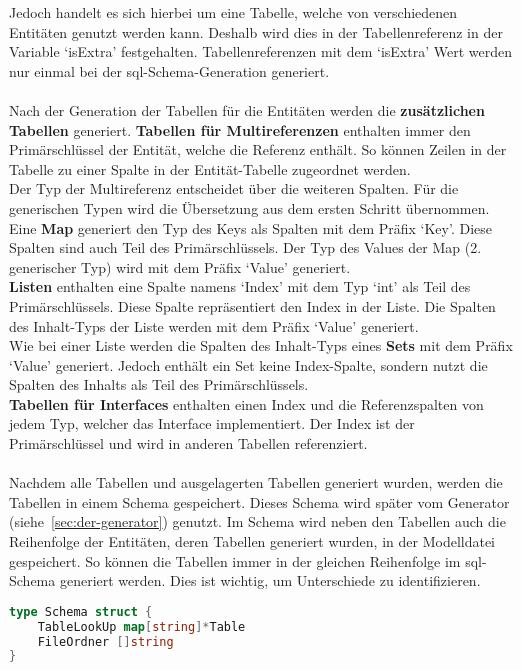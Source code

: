 \documentclass[./einleitung.tex]{subfiles}
\begin{document}
    Jedoch handelt es sich hierbei um eine Tabelle, welche von verschiedenen Entitäten genutzt werden kann.
    Deshalb wird dies in der Tabellenreferenz in der Variable `isExtra' festgehalten.
    Tabellenreferenzen mit dem `isExtra' Wert werden nur einmal bei der \acrshort{sql}-Schema-Generation generiert.
    \\\\
    Nach der Generation der Tabellen für die Entitäten werden die \textbf{zusätzlichen Tabellen} generiert.
    \textbf{Tabellen für Multireferenzen} enthalten immer den Primärschlüssel der Entität, welche die Referenz enthält.
    So können Zeilen in der Tabelle zu einer Spalte in der Entität-Tabelle zugeordnet werden.\\
    Der Typ der Multireferenz entscheidet über die weiteren Spalten.
    Für die generischen Typen wird die Übersetzung aus dem ersten Schritt übernommen.\\
    Eine \textbf{Map} generiert den Typ des Keys als Spalten mit dem Präfix `Key'.
    Diese Spalten sind auch Teil des Primärschlüssels.
    Der Typ des Values der Map (2. generischer Typ) wird mit dem Präfix `Value' generiert.\\
    \textbf{Listen} enthalten eine Spalte namens `Index' mit dem Typ `int' als Teil des Primärschlüssels.
    Diese Spalte repräsentiert den Index in der Liste.
    Die Spalten des Inhalt-Typs der Liste werden mit dem Präfix `Value' generiert.\\
    Wie bei einer Liste werden die Spalten des Inhalt-Typs eines \textbf{Sets} mit dem Präfix `Value' generiert.
    Jedoch enthält ein Set keine Index-Spalte, sondern nutzt die Spalten des Inhalts als Teil des Primärschlüssels.\\
    \textbf{Tabellen für Interfaces} enthalten einen Index und die Referenzspalten von jedem Typ, welcher das Interface implementiert.
    Der Index ist der Primärschlüssel und wird in anderen Tabellen referenziert.
    \\\\
    Nachdem alle Tabellen und ausgelagerten Tabellen generiert wurden, werden die Tabellen in einem Schema gespeichert.
    Dieses Schema wird später vom Generator (siehe~\ref{sec:der-generator}) genutzt.
    Im Schema wird neben den Tabellen auch die Reihenfolge der Entitäten, deren Tabellen generiert wurden, in der Modelldatei gespeichert.
    So können die Tabellen immer in der gleichen Reihenfolge im \acrshort{sql}-Schema generiert werden.
    Dies ist wichtig, um Unterschiede zu identifizieren.
    \begin{lstlisting}[language=Go, caption=Datenstruktur Schema, label=lst:schema]
type Schema struct {
	TableLookUp map[string]*Table
    FileOrdner []string
}
    \end{lstlisting}
\end{document}
